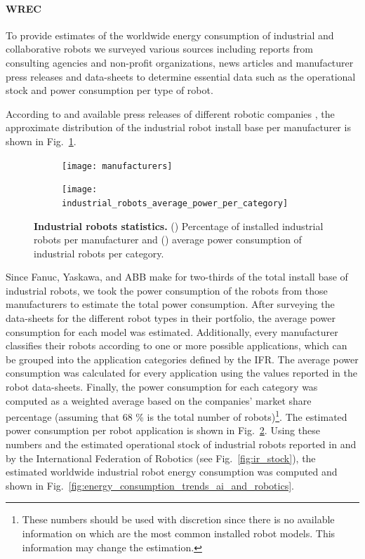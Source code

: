 \paragraph{WREC}
To provide estimates of the worldwide energy consumption of industrial and collaborative robots we surveyed various sources including reports from consulting agencies and non-profit organizations, news articles and manufacturer press releases and data-sheets to determine essential data such as the operational stock and power consumption per type of robot.

According to \cite{montaqim2015} and available press releases of different robotic companies \cite{fanuc2015, yaskawa2014, ABB2015}, the approximate distribution of the industrial robot install base per manufacturer is shown in Fig.~\ref{fig:manufacturers_pie}.
\begin{figure}[!h]
	\centering
	\hspace*{\fill}
	\begin{subfigure}[t]{0.45\textwidth}
		\subcaption{}
		\texttt{[image: manufacturers]}
		\label{fig:manufacturers_pie}
	\end{subfigure}
	\hfill
	\begin{subfigure}[t]{0.45\textwidth}
		\subcaption{}
		\texttt{[image: industrial\_robots\_average\_power\_per\_category]} \label{fig:ir_average_power}
	\end{subfigure}
	\hspace*{\fill}
	\caption[] {\label{fig:ir_statistics} \textbf{Industrial robots statistics.} () Percentage of installed industrial robots per manufacturer and () average power consumption of industrial robots per category.}
\end{figure}

Since Fanuc, Yaskawa, and ABB make for two-thirds of the total install base of industrial robots, we took the power consumption of the robots from those manufacturers to estimate the total power consumption. After surveying the data-sheets for the different robot types in their portfolio, the average power consumption for each model was estimated. Additionally, every manufacturer classifies their robots according to one or more possible applications, which can be grouped into the application categories defined by the IFR. The average power consumption was calculated for every application using the values reported in the robot data-sheets. Finally, the power consumption for each category was computed as a weighted average based on the companies' market share percentage (assuming that 68 \% is the total number of robots)\footnote[1]{These numbers should be used with discretion since there is no available information on which are the most common installed robot models. This information may change the estimation.}. The estimated power consumption per robot application is shown in Fig.~\ref{fig:ir_average_power}. Using these numbers and the estimated operational stock of industrial robots reported in \cite{statista_ir_operational_stock} and by the International Federation of Robotics (see Fig.~\ref{fig:ir_stock}), the estimated worldwide industrial robot energy consumption was computed and shown in Fig.~\ref{fig:energy_consumption_trends_ai_and_robotics}.

